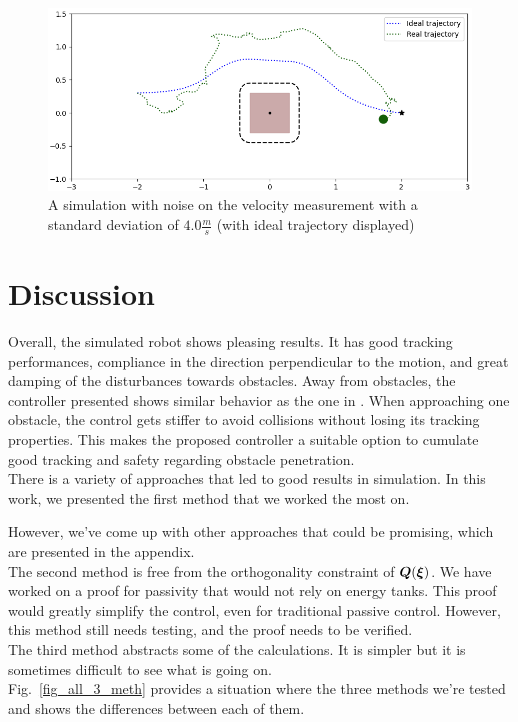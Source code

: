 \documentclass[conference]{IEEEtran}
\begin{document}
\begin{figure}
\centerline{\includegraphics[width=\columnwidth]{figures/vel_noise_4.0.png}}
\caption{A simulation with noise on the velocity measurement with a standard deviation of $4.0 \frac{m}{s}$  (with ideal trajectory displayed)}
\label{fig_2_vel_noise}
\end{figure}
 
\section{Discussion}
Overall, the simulated robot shows pleasing results. It has good tracking performances, compliance in the direction perpendicular to the motion, and great damping of the disturbances towards obstacles.
Away from obstacles, the controller presented shows similar behavior as the one in \cite{kronander2015passive}. When approaching one obstacle, the control gets stiffer to avoid collisions without losing its tracking properties. This makes the proposed controller a suitable option to cumulate good tracking and safety regarding obstacle penetration.\\

There is a variety of approaches that led to good results in simulation. In this work, we presented the first method that we worked the most on. 

However, we've come up with other approaches that could be promising, which are presented in the appendix.\\
The second method is free from the orthogonality constraint of $\boldsymbol{Q}(\boldsymbol{\xi})$. We have worked on a proof for passivity that would not rely on energy tanks. This proof would greatly simplify the control, even for traditional passive control. However, this method still needs testing, and the proof needs to be verified. \\
The third method abstracts some of the calculations. It is simpler but it is sometimes difficult to see what is going on.\\
Fig.~\ref{fig_all_3_meth} provides a situation where the three methods we're tested and shows the differences between each of them. \\
\end{document}
